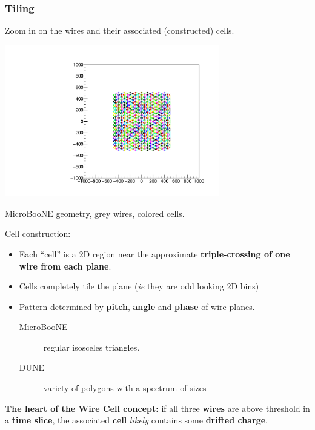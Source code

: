\begin{frame}[fragile]
  \frametitle{Tiling}

  \vspace{-10mm}

  \begin{center}
    \scriptsize Zoom in on the wires and their associated (constructed) cells.

    \includegraphics[width=0.7\textwidth,trim=8.6cm 10cm 8.6cm 9cm,clip]{test_boundcells_uboone.pdf}

    MicroBooNE geometry, grey wires, colored cells.
  \end{center}

  \footnotesize
  Cell construction:
  \begin{itemize}
  \item Each ``cell'' is a 2D region near the approximate \textbf{triple-crossing of one
    wire from each plane}.
  \item Cells completely tile the plane (\textit{ie} they are odd looking 2D bins)
  \item Pattern determined by \textbf{pitch}, \textbf{angle} and \textbf{phase} of wire planes.
    \begin{description}
    \item[MicroBooNE] regular isosceles triangles.
    \item[DUNE] variety of polygons with a spectrum of sizes
    \end{description}
  \end{itemize}

  \textbf{The heart of the Wire Cell concept:} if all three
  \textbf{wires} are above threshold in a \textbf{time slice}, the
  associated \textbf{cell} \textit{likely} contains some 
  \textbf{drifted charge}.

\end{frame}

